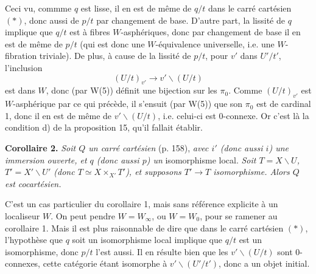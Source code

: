 Ceci vu, commme $q$ est lisse, il en est de même de $q/t$ dans le carré cartésien $(*)$, donc aussi de $p/t$ par changement de base. D'autre part, la lissité de $q$ implique que $q/t$ est à fibres $W$-asphériques, donc par changement de base il en est de même de $p/t$ (qui est donc une $W$-équivalence universelle, i.e. une $W$-fibration triviale). De plus, à cause de la lissité de $p/t$, pour $v'$ dans $U'/t'$, l'inclusion %
\[
(U/t)_{v'} \longrightarrow v' \backslash (U/t)
\]
est dans $W$, donc (par W(5)) définit une bijection sur les $\pi_0$. Comme $(U/t)_{v'}$ est $W$-asphérique par ce qui précède, il s'ensuit (par W(5)) que son $\pi_0$ est de cardinal 1, donc il en est de même de $v' \backslash (U/t)$, i.e. celui-ci est 0-connexe. Or c'est là la condition d) de la proposition 15, qu'il fallait établir.

\textbf{Corollaire 2.} \textit{Soit $Q$ un carré cartésien} (p. 158), \textit{avec $i'$ (donc aussi $i$) une immersion ouverte, et $q$ (donc aussi $p$) un} isomorphisme local. \textit{Soit $T = X \backslash U$, $T' = X' \backslash U'$ (donc $T \simeq X \times_{X'} T'$), et supposons $T' \longrightarrow T$ isomorphisme. Alors $Q$ est cocartésien.}

C'est un cas particulier du corollaire 1, mais sans référence explicite à un localiseur $W$. On peut pendre $W = W_{\infty}$, ou $W = W_0$, pour se ramener au corollaire 1. Mais il est plus raisonnable de dire que dans le carré cartésien $(*)$, l'hypothèse que $q$ soit un isomorphisme local implique que $q/t$ est un isomorphisme, donc $p/t$ l'est aussi. Il en résulte bien que les $v' \backslash (U/t)$ sont 0-connexes, cette catégorie étant isomorphe à $v' \backslash (U'/t')$, donc a un objet initial. %

